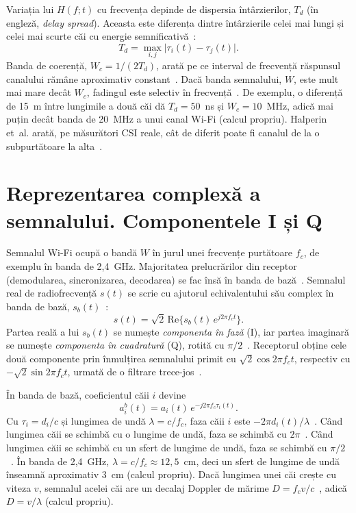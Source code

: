 Variația lui $H(f;t)$ cu frecvența depinde de dispersia întârzierilor, $T_d$ (în engleză, \emph{delay spread}).
Aceasta este diferența dintre întârzierile celei mai lungi și celei mai scurte căi cu energie semnificativă~\cite[Sec.~2.3.2]{tse2005}:
\begin{equation}\label{eq:td}
	T_d = \max_{i,j} \bigl|\tau_i(t) - \tau_j(t)\bigr|.
\end{equation}
Banda de coerență, $W_c = 1/(2T_d)$, arată pe ce interval de frecvență răspunsul canalului rămâne aproximativ constant~\cite[Tab.~2.1]{tse2005}.
Dacă banda semnalului, $W$, este mult mai mare decât $W_c$, fadingul este selectiv în frecvență~\cite[Tab.~2.2]{tse2005}.
De exemplu, o diferență de 15~m între lungimile a două căi dă $T_d = 50$~ns și $W_c = 10$~MHz, adică mai puțin decât banda de 20~MHz a unui canal Wi-Fi (calcul propriu).
Halperin et~al. arată, pe măsurători CSI reale, cât de diferit poate fi canalul de la o subpurtătoare la alta~\cite[Sec.~2]{halperin2011}.

\section{Reprezentarea complexă a semnalului. Componentele I și Q}\label{sec:iq}

Semnalul Wi-Fi ocupă o bandă $W$ în jurul unei frecvențe purtătoare $f_c$, de exemplu în banda de 2,4~GHz.
Majoritatea prelucrărilor din receptor (demodularea, sincronizarea, decodarea) se fac însă în banda de bază~\cite[Sec.~2.2.2]{tse2005}.
Semnalul real de radiofrecvență $s(t)$ se scrie cu ajutorul echivalentului său complex în banda de bază, $s_b(t)$~\cite[ec.~(2.23)]{tse2005}:
\begin{equation}\label{eq:banda_baza}
	s(t) = \sqrt{2}\, \mathrm{Re}\bigl\{ s_b(t)\, e^{j2\pi f_c t} \bigr\}.
\end{equation}
Partea reală a lui $s_b(t)$ se numește \emph{componenta în fază} (I), iar partea imaginară se numește \emph{componenta în cuadratură} (Q), rotită cu $\pi/2$~\cite[Sec.~2.2.2]{tse2005}.
Receptorul obține cele două componente prin înmulțirea semnalului primit cu $\sqrt{2}\cos 2\pi f_c t$, respectiv cu $-\sqrt{2}\sin 2\pi f_c t$, urmată de o filtrare trece-jos~\cite[Fig.~2.8]{tse2005}.

În banda de bază, coeficientul căii $i$ devine~\cite[ec.~(2.27)]{tse2005}
\begin{equation}\label{eq:ab}
	a_i^b(t) = a_i(t)\, e^{-j2\pi f_c \tau_i(t)}.
\end{equation}
Cu $\tau_i = d_i/c$ și lungimea de undă $\lambda = c/f_c$, faza căii $i$ este $-2\pi d_i(t)/\lambda$~\cite[Sec.~3.2]{wang2015carm}.
Când lungimea căii se schimbă cu o lungime de undă, faza se schimbă cu $2\pi$~\cite[Sec.~3.2]{wang2015carm}.
Când lungimea căii se schimbă cu un sfert de lungime de undă, faza se schimbă cu $\pi/2$~\cite[Sec.~2.2.2]{tse2005}.
În banda de 2,4~GHz, $\lambda = c/f_c \approx 12{,}5$~cm, deci un sfert de lungime de undă înseamnă aproximativ 3~cm (calcul propriu).
Dacă lungimea unei căi crește cu viteza $v$, semnalul acelei căi are un decalaj Doppler de mărime $D = f_c v/c$~\cite[Tab.~2.1]{tse2005}, adică $D = v/\lambda$ (calcul propriu).

